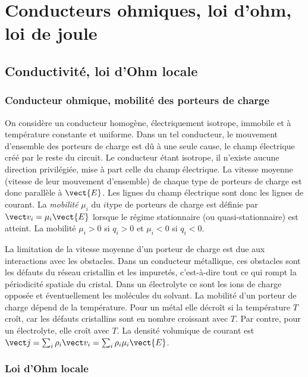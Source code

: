 \chapter{Conducteurs ohmiques, loi d'ohm, loi de joule}
\minitoc
\minilof
\minilot

\section{Conductivité, loi d'Ohm locale}
\label{chap10-sec:conductivite}

\subsection{Conducteur ohmique, mobilité des porteurs de charge}
\label{chap10-subsec:conducteurohmique}

On considère un conducteur homogène, électriquement isotrope, immobile et à température constante et uniforme. 
Dans un tel conducteur, le mouvement d'ensemble des porteurs de charge est dû à une seule cause, le champ électrique créé par le reste du circuit.
Le conducteur étant isotrope, il n'existe aucune direction privilégiée, mise à part celle du champ électrique. La vitesse moyenne (vitesse de leur mouvement d'ensemble) de chaque type de porteurs de charge est donc parallèle à $\vect{E}$. Les lignes du champ électrique sont donc les lignes de courant.
La \emph{mobilité} $\mu_i$ du $i$\ieme type de porteurs de charge est définie par $\vv_i= \mu_i \vect{E}$ lorsque le régime stationnaire (ou quasi-stationnaire) est atteint. La mobilité $\mu_i > 0$ si $q_i > 0$ et $\mu_i < 0$ si $q_i < 0$.

La limitation de la vitesse moyenne d'un porteur de charge est due aux interactions avec les obstacles. Dans un conducteur métallique, ces obstacles sont les défauts du réseau cristallin et les impuretés, c'est-à-dire tout ce qui rompt la périodicité spatiale du cristal. Dans un électrolyte ce sont les ions de charge opposée et éventuellement les molécules du solvant.
La mobilité d'un porteur de charge dépend de la température. Pour un métal elle décroît si la température $T$ croît, car les défauts cristallins sont en nombre croissant avec $T$. Par contre, pour un électrolyte, elle croît avec $T$.
La densité volumique de courant est $\vj = \sum_i \rho_i \vv_i = \sum_i \rho_i \mu_i \vect{E}$.

\subsection{Loi d'Ohm locale}
\label{sec:loidOhmlocale}

